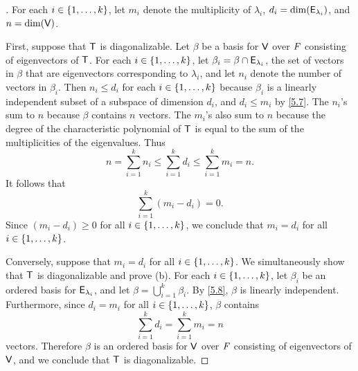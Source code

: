 \begin{proof}[]
  For each \(i \in \left\lbrace1, \dots, k\right\rbrace\), let \(m_i\) denote the multiplicity of \(\lambda_i\), \(d_i = \dim(\mathsf{E}_{\lambda_i})\), and \(n = \dim(\mathsf{V})\).

  First, suppose that \(\mathsf{T}\) is diagonalizable.
  Let \(\beta\) be a basis for \(\mathsf{V}\) over \(\mathit{F}\) consisting of eigenvectors of \(\mathsf{T}\).
  For each \(i \in \left\lbrace1, \dots, k\right\rbrace\), let \(\beta_i = \beta \cap \mathsf{E}_{\lambda_i}\), the set of vectors in \(\beta\) that are eigenvectors corresponding to \(\lambda_i\), and let \(n_i\) denote the number of vectors in \(\beta_i\).
  Then \(n_i \leq d_i\) for each \(i \in \left\lbrace1, \dots, k\right\rbrace\) because \(\beta_i\) is a linearly independent subset of a subspace of dimension \(d_i\), and \(d_i \leq m_i\) by \cref{5.7}.
  The \(n_i\)'s sum to \(n\) because \(\beta\) contains \(n\) vectors.
  The \(m_i\)'s also sum to \(n\) because the degree of the characteristic polynomial of \(\mathsf{T}\) is equal to the sum of the multiplicities of the eigenvalues.
  Thus
  \[
    n = \sum_{i = 1}^k n_i \leq \sum_{i = 1}^k d_i \leq \sum_{i = 1}^k m_i = n.
  \]
  It follows that
  \[
    \sum_{i = 1}^k (m_i - d_i) = 0.
  \]
  Since \((m_i - d_i) \geq 0\) for all \(i \in \left\lbrace1, \dots, k\right\rbrace\), we conclude that \(m_i = d_i\) for all \(i \in \left\lbrace1, \dots, k\right\rbrace\).

  Conversely, suppose that \(m_i = d_i\) for all \(i \in \left\lbrace1, \dots, k\right\rbrace\).
  We simultaneously show that \(\mathsf{T}\) is diagonalizable and prove (b).
  For each \(i \in \left\lbrace1, \dots, k\right\rbrace\), let \(\beta_i\) be an ordered basis for \(\mathsf{E}_{\lambda_i}\), and let \(\beta = \bigcup_{i = 1}^k \beta_i\).
  By \cref{5.8}, \(\beta\) is linearly independent.
  Furthermore, since \(d_i = m_i\) for all \(i \in \left\lbrace1, \dots, k\right\rbrace\), \(\beta\) contains
  \[
    \sum_{i = 1}^k d_i = \sum_{i = 1}^k m_i = n
  \]
  vectors.
  Therefore \(\beta\) is an ordered basis for \(\mathsf{V}\) over \(\mathit{F}\) consisting of eigenvectors of \(\mathsf{V}\), and we conclude that \(\mathsf{T}\) is diagonalizable.
\end{proof}

